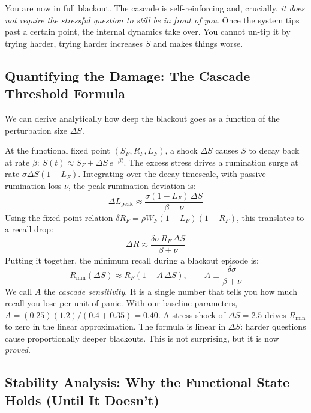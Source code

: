 \documentclass[11pt,a4paper]{article}
\begin{document}
You are now in full blackout. The cascade is self-reinforcing and,
crucially, \emph{it does not require the stressful question to still
be in front of you}. Once the system tips past a certain point, the
internal dynamics take over. You cannot un-tip it by trying harder,
trying harder increases $S$ and makes things worse.

\subsection{Quantifying the Damage: The Cascade Threshold Formula}

We can derive analytically how deep the blackout goes as a function
of the perturbation size $\Delta S$.

At the functional fixed point $(S_F, R_F, L_F)$, a shock $\Delta S$
causes $S$ to decay back at rate $\beta$: $S(t) \approx S_F +
\Delta S\, e^{-\beta t}$. The excess stress drives a rumination
surge at rate $\sigma \Delta S (1-L_F)$. Integrating over the
decay timescale, with passive rumination loss $\nu$, the peak
rumination deviation is:
\begin{equation}
  \Delta L_{\mathrm{peak}} \approx \frac{\sigma(1-L_F)\,\Delta S}{\beta + \nu}
  \label{eq:DL}
\end{equation}
Using the fixed-point relation $\delta R_F = \rho W_F(1-L_F)(1-R_F)$,
this translates to a recall drop:
\begin{equation}
  \Delta R \approx \frac{\delta\sigma\,R_F\,\Delta S}{\beta + \nu}
  \label{eq:DR}
\end{equation}
Putting it together, the minimum recall during a blackout episode is:
\begin{equation}
  \boxed{R_{\min}(\Delta S) \approx R_F\left(1 - A\,\Delta S\right),
  \qquad A \equiv \frac{\delta\sigma}{\beta + \nu}}
  \label{eq:Rmin}
\end{equation}
We call $A$ the \emph{cascade sensitivity}. It is a single number
that tells you how much recall you lose per unit of panic. With our
baseline parameters, $A = (0.25)(1.2)/(0.4 + 0.35) = 0.40$. A
stress shock of $\Delta S = 2.5$ drives $R_{\min}$ to zero in the
linear approximation. The formula is linear in $\Delta S$: harder
questions cause proportionally deeper blackouts. This is not
surprising, but it is now \emph{proved.}

\subsection{Stability Analysis: Why the Functional State Holds (Until It Doesn't)}
\end{document}
